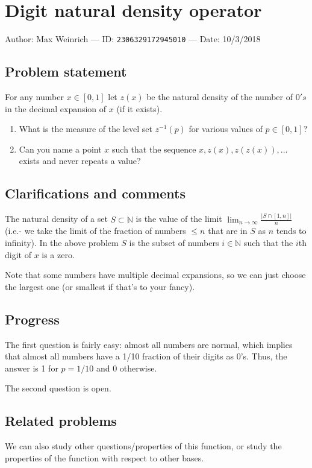 
\section{Digit natural density operator}

Author: Max Weinrich --- ID: \verb`2306329172945010` --- Date: 10/3/2018

\subsection{Problem statement}

For any number $x\in[0,1]$ let $z(x)$ be the natural density of the number of $0's$ in the decimal expansion of $x$ (if it exists).

\begin{enumerate}
\item What is the measure of the level set $z^{-1}(p)$ for various values of $p\in[0,1]$?
\item Can you name a point $x$ such that the sequence $x,z(x),z(z(x)),\ldots$ exists and never repeats a value?
\end{enumerate}

\subsection{Clarifications and comments}

The natural density of a set $S\subset\mathbb{N}$ is the value of the limit $\lim_{n\to\infty}\frac{\lvert S\cap[1,n]\rvert}{n}$ (i.e.- we take the limit of the fraction of numbers $\leq n$ that are in $S$ as $n$ tends to infinity). In the above problem $S$ is the subset of numbers $i\in\mathbb{N}$ such that the $i$th digit of $x$ is a zero.

Note that some numbers have multiple decimal expansions, so we can just choose the largest one (or smallest if that's to your fancy).

\subsection{Progress}

The first question is fairly easy: almost all numbers are normal, which implies that almost all numbers have a 1/10 fraction of their digits as 0's. Thus, the answer is 1 for $p=1/10$ and 0 otherwise.

The second question is open.

\subsection{Related problems}

We can also study other questions/properties of this function, or study the properties of the function with respect to other bases.

